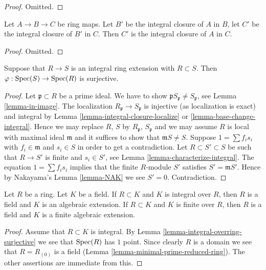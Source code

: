 \begin{proof}
Omitted.
\end{proof}

\begin{lemma}
\label{lemma-integral-closure-transitive}
Let $A \to B \to C$ be ring maps.
Let $B'$ be the integral closure of $A$ in $B$,
let $C'$ be the integral closure of $B'$ in $C$. Then
$C'$ is the integral closure of $A$ in $C$.
\end{lemma}

\begin{proof}
Omitted.
\end{proof}

\begin{lemma}
\label{lemma-integral-overring-surjective}
Suppose that $R \to S$ is an integral
ring extension with $R \subset S$.
Then $\varphi : \mathop{\mathrm{Spec}}(S) \to \mathop{\mathrm{Spec}}(R)$
is surjective.
\end{lemma}

\begin{proof}
Let $\mathfrak p \subset R$ be a prime ideal.
We have to show $\mathfrak pS_{\mathfrak p} \not = S_{\mathfrak p}$, see
Lemma \ref{lemma-in-image}.
The localization $R_{\mathfrak p} \to S_{\mathfrak p}$ is injective
(as localization is exact) and integral by
Lemma \ref{lemma-integral-closure-localize} or
\ref{lemma-base-change-integral}.
Hence we may replace $R$, $S$ by $R_{\mathfrak p}$, $S_{\mathfrak p}$ and
we may assume $R$ is local with maximal ideal $\mathfrak m$ and
it suffices to show that $\mathfrak mS \not = S$.
Suppose $1 = \sum f_i s_i$ with $f_i \in \mathfrak m$
and $s_i \in S$ in order to get a contradiction.
Let $R \subset S' \subset S$
be such that $R \to S'$ is finite and $s_i \in S'$, see
Lemma \ref{lemma-characterize-integral}.
The equation $1 = \sum f_i s_i$ implies that
the finite $R$-module $S'$ satisfies $S' = \mathfrak m S'$. Hence by
Nakayama's Lemma \ref{lemma-NAK}
we see $S' = 0$. Contradiction.
\end{proof}

\begin{lemma}
\label{lemma-integral-under-field}
Let $R$ be a ring. Let $K$ be a field.
If $R \subset K$ and $K$ is integral over $R$,
then $R$ is a field and $K$ is an algebraic extension.
If $R \subset K$ and $K$ is finite over $R$,
then $R$ is a field and $K$ is a finite algebraic extension.
\end{lemma}

\begin{proof}
Assume that $R \subset K$ is integral.
By Lemma \ref{lemma-integral-overring-surjective} we see that
$\mathop{\mathrm{Spec}}(R)$ has $1$ point. Since clearly $R$ is a domain we see
that $R = R_{(0)}$ is a field (Lemma \ref{lemma-minimal-prime-reduced-ring}).
The other assertions are immediate from this.
\end{proof}

